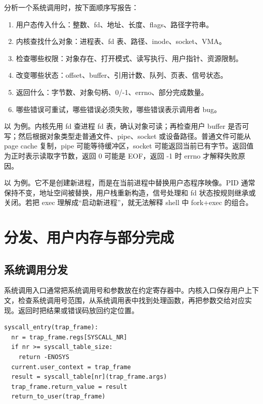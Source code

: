分析一个系统调用时，按下面顺序写报告：

\begin{enumerate}
\tightlist
\item 用户态传入什么：整数、fd、地址、长度、flags、路径字符串。
\item 内核查找什么对象：进程表、fd 表、路径、inode、socket、VMA。
\item 检查哪些权限：对象存在、打开模式、读写执行、用户指针、资源限制。
\item 改变哪些状态：offset、buffer、引用计数、队列、页表、信号状态。
\item 返回什么：字节数、对象句柄、0/-1、errno、部分完成数量。
\item 哪些错误可重试，哪些错误必须失败，哪些错误表示调用者 bug。
\end{enumerate}

以  为例。内核先用 fd 查进程 fd 表，确认对象可读；再检查用户 buffer 是否可写；然后根据对象类型走普通文件、pipe、socket 或设备路径。普通文件可能从 page cache 复制，pipe 可能等待缓冲区，socket 可能返回当前已有字节。返回值为正时表示读取字节数，返回 0 可能是 EOF，返回 -1 时 errno 才解释失败原因。

以  为例。它不是创建新进程，而是在当前进程中替换用户态程序映像。PID 通常保持不变，地址空间被替换，用户栈重新构造，信号处理和 fd 状态按规则继承或关闭。若把 exec 理解成“启动新进程”，就无法解释 shell 中 fork+exec 的组合。

\section{分发、用户内存与部分完成}

\subsection{系统调用分发}

系统调用入口通常把系统调用号和参数放在约定寄存器中。内核入口保存用户上下文，检查系统调用号范围，从系统调用表中找到处理函数，再把参数交给对应实现。返回时把结果或错误码放回约定位置。

\begin{lstlisting}
syscall_entry(trap_frame):
  nr = trap_frame.regs[SYSCALL_NR]
  if nr >= syscall_table_size:
    return -ENOSYS
  current.user_context = trap_frame
  result = syscall_table[nr](trap_frame.args)
  trap_frame.return_value = result
  return_to_user(trap_frame)
\end{lstlisting}

